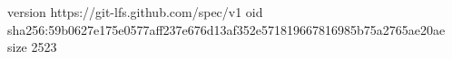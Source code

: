 version https://git-lfs.github.com/spec/v1
oid sha256:59b0627e175e0577aff237e676d13af352e571819667816985b75a2765ae20ae
size 2523
